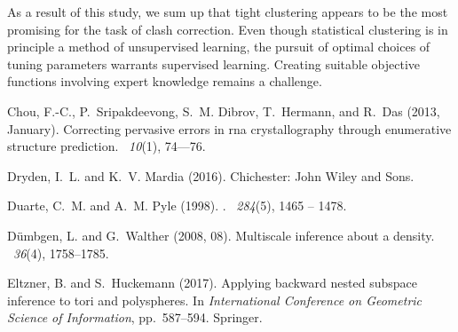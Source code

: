 \documentclass{llncs}
\begin{document}
As a result of this study,  we sum up that tight clustering appears to be the most promising for the task of clash correction. %
Even though statistical clustering is in principle a method of unsupervised learning, the pursuit of optimal choices of tuning parameters warrants supervised learning. Creating suitable objective functions involving expert knowledge remains  a challenge.

\begin{thebibliography}{}
  \thispagestyle{plain}
  
  Chou, F.-C., P.~Sripakdeevong, S.~M. Dibrov, T.~Hermann, and R.~Das (2013,
  January).
  \newblock Correcting pervasive errors in rna crystallography through
  enumerative structure prediction.
  ~{\em 10\/}(1), 74—76.
  
  Dryden, I.~L. and K.~V. Mardia (2016).
  \newblock Chichester: John Wiley and Sons.
  
  Duarte, C.~M. and A.~M. Pyle (1998).
  .
  ~{\em 284\/}(5), 1465 -- 1478.
  
  Dümbgen, L. and G.~Walther (2008, 08).
  \newblock Multiscale inference about a density.
  ~{\em 36\/}(4), 1758--1785.
  
  Eltzner, B. and S.~Huckemann (2017).
  \newblock Applying backward nested subspace inference to tori and polyspheres.
  \newblock In {\em International Conference on Geometric Science of
    Information}, pp.\  587--594. Springer.
  

\end{thebibliography}
\end{document}
